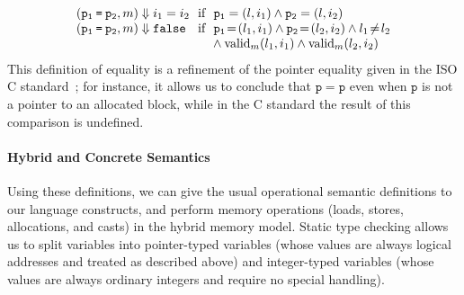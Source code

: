 \[\begin{array}{@{}l@{~}l@{}}
(\mathtt{p_1 \mathbin{\code{=}} p_2}, m) \Downarrow i_1 = i_2 & \text{ if }~ \mathtt{p_1} = (l, i_1) \land \mathtt{p_2} = (l, i_2) \\
(\mathtt{p_1 \mathbin{\code{=}} p_2}, m) \Downarrow \code{false} & \text{ if }~ 
\mathtt{p_1} \!=\! (l_1, i_1) \land \mathtt{p_2} \!=\! (l_2, i_2) \land l_1 \!\neq\! l_2 \\
  & \quad{}~ \land \text{valid}_m(l_1,i_1) \land \text{valid}_m(l_2,i_2) \\
\end{array}
\]
This definition of equality is a refinement of the pointer equality given in the ISO C standard~\cite{iso2011iec}; for instance, it allows us to conclude that $\mathtt{p = p}$ even when $\mathtt{p}$ is not a pointer to an allocated block, while in the C standard the result of this comparison is undefined.


\paragraph{Hybrid and Concrete Semantics}
Using these definitions, we can give the usual operational semantic definitions to our language constructs, and perform memory operations (loads, stores, allocations, and casts) in the hybrid memory model. Static type checking allows us to split variables into pointer-typed variables (whose values are %
always logical addresses
and treated as described above) and integer-typed variables (whose values are always ordinary integers and require no special handling). 

